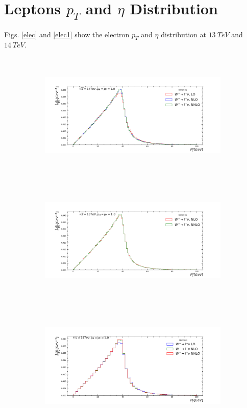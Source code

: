 \section{Leptons $p_{T}$ and $\eta$ Distribution}
Figs. \ref{elec} and \ref{elec1} show the electron $p_{T}$ and $\eta$ distribution at $13~TeV$ and $14~TeV$.
\begin{figure}[H]
\centering
\begin{subfigure}{0.49\textwidth}
\includegraphics[height=6cm ,width=\textwidth]{chapter4/Ewppt_rf1_14.pdf}
\vspace*{-8mm}
\caption{}
\label{ept141}
\end{subfigure}
\begin{subfigure}{0.49\textwidth}
\includegraphics[height=6cm, width=\textwidth]{chapter4/Ewppt_rf1_13.pdf}
\vspace*{-8mm}
\caption{}
\label{ept131}
\end{subfigure}
\begin{subfigure}{0.49\textwidth}
\includegraphics[height=6cm, width=\textwidth]{chapter4/Ewmpt_rf1_14.pdf}

\end{subfigure}
\end{figure}
